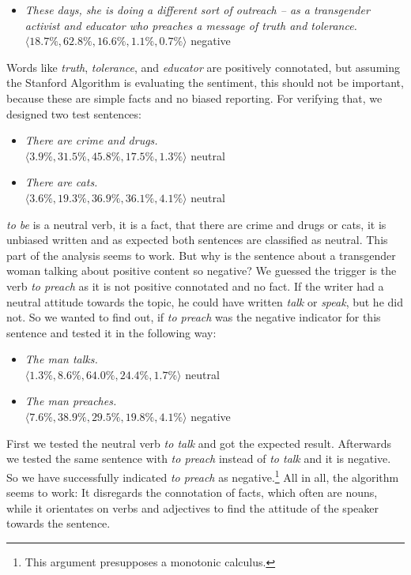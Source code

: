 \documentclass[10pt,a4paper,twocolumn]{scrartcl}
\begin{document}
\begin{itemize}
\item[ ] \textit{These days, she is doing a different sort of outreach -- as a transgender activist and educator who preaches a message of truth and tolerance.}\\
$\langle 18.7\%,62.8\%,16.6\%,1.1\%,0.7\%\rangle$ \hfill negative
\end{itemize}


Words like \textit{truth}, \textit{tolerance}, and \textit{educator} are positively connotated, but assuming the Stanford Algorithm is evaluating the sentiment, this should not be important, because these are simple facts and no biased reporting. For verifying that, we designed two test sentences:

\begin{itemize}
\item[ ] \textit{There are crime and drugs.}\\
$\langle 3.9\%, 31.5\%, 45.8\%, 17.5\%, 1.3\%\rangle$ \hfill neutral
\item[ ]\textit{There are cats.}\\
$\langle 3.6\%, 19.3\%, 36.9\%, 36.1\%, 4.1\%\rangle$ \hfill neutral
\end{itemize}

\textit{to be} is a neutral verb, it is a fact, that there are crime and drugs or cats, it is unbiased written and as expected both sentences are classified as neutral. This part of the analysis seems to work. But why is the sentence about a transgender woman talking about positive content so negative? We guessed the trigger is the verb \textit{to preach} as it is not positive connotated and no fact. If the writer had a neutral attitude towards the topic, he could have written \textit{talk} or \textit{speak}, but he did not. So we wanted to find out, if \textit{to preach} was the negative indicator for this sentence and tested it in the following way:

\begin{itemize}
\item[ ] \textit{The man talks.}\\
$\langle 1.3\%, 8.6\%, 64.0\%, 24.4\%, 1.7\%\rangle$ \hfill neutral
\item[ ] \textit{The man preaches.}\\
$\langle 7.6\%, 38.9\%, 29.5\%, 19.8\%, 4.1\%\rangle$ \hfill negative
\end{itemize}

First we tested the neutral verb \textit{to talk} and got the expected result. Afterwards we tested the same sentence with \textit{to preach} instead of \textit{to talk} and it is negative. So we have successfully indicated \textit{to preach} as negative.\footnote{This argument presupposes a monotonic calculus.} All in all, the algorithm seems to work: It disregards the connotation of facts, which often are nouns, while it orientates on verbs and adjectives to find the attitude of the speaker towards the sentence.
\end{document}
